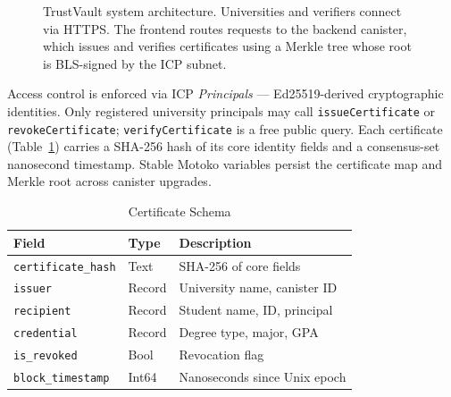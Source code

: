 \documentclass[conference]{IEEEtran}
\begin{document}
\begin{figure}[t]
\caption{TrustVault system architecture. Universities and verifiers connect via HTTPS. The frontend routes requests to the backend canister, which issues and verifies certificates using a Merkle tree whose root is BLS-signed by the ICP subnet.}
\label{fig:sysarch}
\end{figure}

Access control is enforced via ICP \textit{Principals} — Ed25519-derived cryptographic identities. Only registered university principals may call \texttt{issueCertificate} or \texttt{revokeCertificate}; \texttt{verifyCertificate} is a free public query. Each certificate (Table~\ref{tab:schema}) carries a SHA-256 hash of its core identity fields and a consensus-set nanosecond timestamp. Stable Motoko variables persist the certificate map and Merkle root across canister upgrades.

\begin{table}[h]
\caption{Certificate Schema}
\label{tab:schema}
\centering\small\renewcommand{\arraystretch}{1.1}
\begin{tabular}{@{}lll@{}}
\toprule
\textbf{Field} & \textbf{Type} & \textbf{Description} \\
\midrule
\texttt{certificate\_hash} & Text   & SHA-256 of core fields \\
\texttt{issuer}            & Record & University name, canister ID \\
\texttt{recipient}         & Record & Student name, ID, principal \\
\texttt{credential}        & Record & Degree type, major, GPA \\
\texttt{is\_revoked}       & Bool   & Revocation flag \\
\texttt{block\_timestamp}  & Int64  & Nanoseconds since Unix epoch \\
\bottomrule
\end{tabular}
\end{table}
\end{document}
